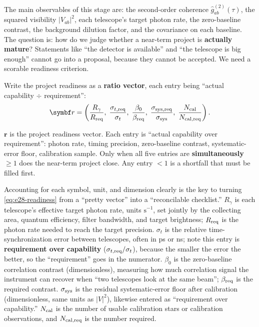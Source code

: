 The main observables of this stage are: the second-order coherence \(\hat g^{(2)}_{ab}(\tau)\), the squared visibility \(|V_{ab}|^2\), each telescope's target photon rate, the zero-baseline contrast, the background dilution factor, and the covariance on each baseline. The question is: how do we judge whether a near-term project is \textbf{actually mature}? Statements like ``the detector is available'' and ``the telescope is big enough'' cannot go into a proposal, because they cannot be accepted. We need a scorable readiness criterion.

Write the project readiness as a \textbf{ratio vector}, each entry being ``actual capability \(\div\) requirement'':
\begin{equation}
  \bm{r}=
  \left(
  \frac{R_\gamma}{R_{\rm req}},\;
  \frac{\sigma_{t,{\rm req}}}{\sigma_t},\;
  \frac{\beta_0}{\beta_{\rm req}},\;
  \frac{\sigma_{{\rm sys,req}}}{\sigma_{\rm sys}},\;
  \frac{N_{\rm cal}}{N_{{\rm cal,req}}}
  \right).
  \label{eq:e28-readiness}
\end{equation}
\begin{formulaexplain}
\(\bm r\) is the project readiness vector. Each entry is ``actual capability over requirement'': photon rate, timing precision, zero-baseline contrast, systematic-error floor, calibration sample. Only when all five entries are \textbf{simultaneously} \(\ge1\) does the near-term project close. Any entry \(<1\) is a shortfall that must be filled first.
\end{formulaexplain}
Accounting for each symbol, unit, and dimension clearly is the key to turning \eqref{eq:e28-readiness} from a ``pretty vector'' into a ``reconcilable checklist.'' \(R_\gamma\) is each telescope's effective target photon rate, units \(\mathrm{s^{-1}}\), set jointly by the collecting area, quantum efficiency, filter bandwidth, and target brightness; \(R_{\rm req}\) is the photon rate needed to reach the target precision. \(\sigma_t\) is the relative time-synchronization error between telescopes, often in ps or ns; note this entry is \textbf{requirement over capability} (\(\sigma_{t,{\rm req}}/\sigma_t\)), because the smaller the error the better, so the ``requirement'' goes in the numerator. \(\beta_0\) is the zero-baseline correlation contrast (dimensionless), measuring how much correlation signal the instrument can recover when ``two telescopes look at the same beam''; \(\beta_{\rm req}\) is the required contrast. \(\sigma_{\rm sys}\) is the residual systematic-error floor after calibration (dimensionless, same units as \(|V|^2\)), likewise entered as ``requirement over capability.'' \(N_{\rm cal}\) is the number of usable calibration stars or calibration observations, and \(N_{\rm cal,req}\) is the number required.

